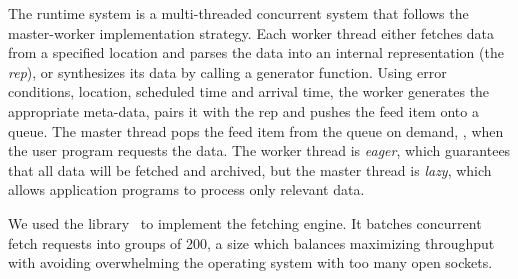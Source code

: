 The \padsd{} runtime system is a multi-threaded concurrent
system that follows the  master-worker implementation strategy. 
Each worker thread either fetches data from a specified
location and parses the data into an internal representation (the {\em rep}),
or synthesizes its data by calling a
generator function.  Using error conditions, location, scheduled time
and arrival time, the worker generates the appropriate meta-data,
pairs it with the rep and pushes the feed item onto a queue. 
The master thread pops the feed item from the queue on demand, \ie{},
when the user program requests the data. 
The worker thread is {\em eager}, which guarantees that all 
data will be fetched and archived, but the master thread is 
{\em lazy}, which allows application programs to process only relevant
data. 


We used the \ocamlnet{} library~\cite{ocamlnet2} to implement
the fetching engine. It batches concurrent fetch requests into groups
of 200, a size which balances maximizing throughput with avoiding
overwhelming the operating system with too many open sockets.




 
